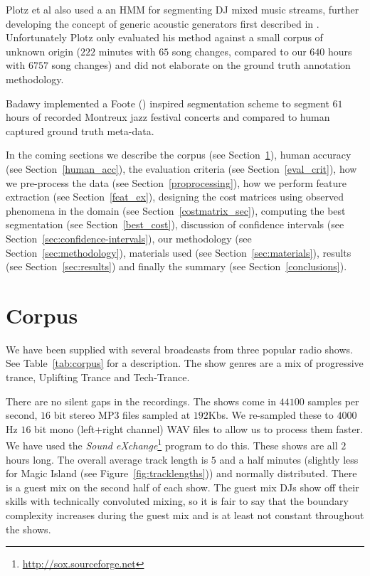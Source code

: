 \documentclass[twocolumn]{article}
\begin{document}
	Plotz et al also used a an HMM for segmenting DJ mixed music streams, further developing the concept of generic acoustic generators first described in \citep{batlle2002automatic}. Unfortunately Plotz only evaluated his method against a small corpus of unknown origin ($222$ minutes with $65$ song changes, compared to our $640$ hours with $6757$ song changes) and did not elaborate on the ground truth annotation methodology. 
	
	Badawy implemented a Foote (\citep{foote2003media}) inspired segmentation scheme to segment $61$ hours of recorded Montreux jazz festival concerts and compared to human captured ground truth meta-data. 
	
	In the coming sections we describe the corpus (see Section~\ref{dataset}), human accuracy (see Section~\ref{human_acc}),  the evaluation criteria (see Section~\ref{eval_crit}), how we pre-process the data (see Section~\ref{proprocessing}), how we perform feature extraction (see Section~\ref{feat_ex}), designing the cost matrices using observed phenomena in the domain (see Section~\ref{costmatrix_sec}), computing the best segmentation (see Section~\ref{best_cost}), discussion of confidence intervals (see Section~\ref{sec:confidence-intervals}), our methodology (see Section~\ref{sec:methodology}), materials used (see Section~\ref{sec:materials}), results (see Section~\ref{sec:results}) and finally the summary (see Section~\ref{conclusions}).
	
	\section{Corpus}\label{dataset}
	
	We have been supplied with several broadcasts from three popular radio shows. See Table~\ref{tab:corpus} for a description. The show genres are a mix of progressive trance, Uplifting Trance and Tech-Trance. 
	
	There are no silent gaps in the recordings. The shows come in $44100$ samples per second, $16$ bit stereo MP3 files sampled at $192$Kbs. We re-sampled these to $4000$Hz $16$ bit mono (left+right channel) WAV files to allow us to process them faster. We have used the \textit{Sound eXchange}\footnote{\url{http://sox.sourceforge.net}} program to do this. These shows are all $2$ hours long. The overall average track length is $5$ and a half minutes (slightly less for Magic Island (see Figure~\ref{fig:tracklengths})) and normally distributed.  There is a guest mix on the second half of each show. The guest mix DJs show off their skills with technically convoluted mixing, so it is fair to say that the boundary complexity increases during the guest mix and is at least not constant throughout the shows.
	
\end{document}
